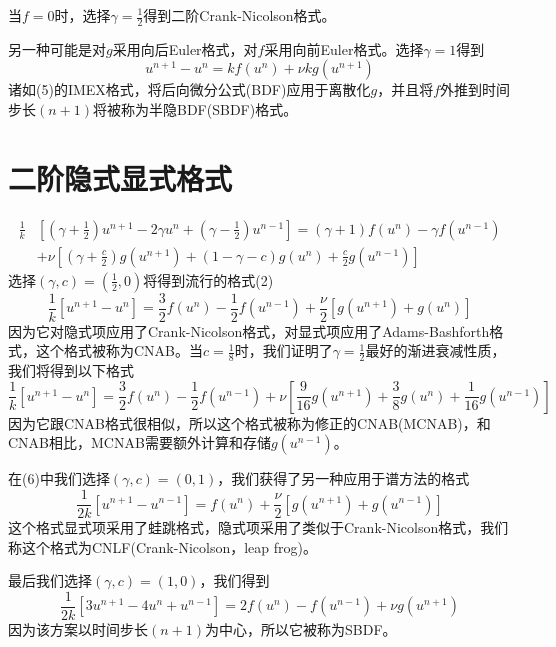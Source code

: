 \documentclass[12pt,a4paper]{article}
\begin{document}
当$f=0$时，选择$\gamma=\frac{1}{2}$得到二阶Crank-Nicolson格式。

另一种可能是对$g$采用向后Euler格式，对$f$采用向前Euler格式。选择$\gamma=1$得到
\begin{equation}
u^{n+1}-u^n=kf(u^n)+\nu kg(u^{n+1})
\end{equation}
诸如(5)的IMEX格式，将后向微分公式(BDF)应用于离散化$g$，并且将$f$外推到时间步长$(n+1)$将被称为半隐BDF(SBDF)格式。
\section{二阶隐式显式格式}
\begin{equation}
\begin{aligned}
\frac{1}{k}&\left[\left(\gamma+\frac{1}{2}\right)u^{n+1}-2\gamma u^n+\left(\gamma-\frac{1}{2}\right)u^{n-1}\right]=(\gamma+1)f(u^n)-\gamma f(u^{n-1})\\
&+\nu\left[\left(\gamma+\frac{c}{2}\right)g(u^{n+1})+(1-\gamma-c)g(u^n)+\frac{c}{2}g(u^{n-1})\right]
\end{aligned}
\end{equation}
选择$(\gamma,c)=(\frac{1}{2},0)$将得到流行的格式(2)
\begin{equation}
\frac{1}{k}[u^{n+1}-u^n]=\frac{3}{2}f(u^n)-\frac{1}{2}f(u^{n-1})+\frac{\nu}{2}[g(u^{n+1})+g(u^n)]
\end{equation}
因为它对隐式项应用了Crank-Nicolson格式，对显式项应用了Adams-Bashforth格式，这个格式被称为CNAB。当$c=\frac{1}{8}$时，我们证明了$\gamma=\frac{1}{2}$最好的渐进衰减性质，我们将得到以下格式
\begin{equation}
\frac{1}{k}[u^{n+1}-u^n]=\frac{3}{2}f(u^n)-\frac{1}{2}f(u^{n-1})+\nu\left[\frac{9}{16}g(u^{n+1})+\frac{3}{8}g(u^n)+\frac{1}{16}g(u^{n-1})\right]
\end{equation}
因为它跟CNAB格式很相似，所以这个格式被称为修正的CNAB(MCNAB)，和CNAB相比，MCNAB需要额外计算和存储$g(u^{n-1})$。

在(6)中我们选择$(\gamma,c)=(0,1)$，我们获得了另一种应用于谱方法的格式
\begin{equation}
\frac{1}{2k}[u^{n+1}-u^{n-1}]=f(u^n)+\frac{\nu}{2}[g(u^{n+1})+g(u^{n-1})]
\end{equation}
这个格式显式项采用了蛙跳格式，隐式项采用了类似于Crank-Nicolson格式，我们称这个格式为CNLF(Crank-Nicolson，leap frog)。

最后我们选择$(\gamma,c)=(1,0)$，我们得到
\begin{equation}
\frac{1}{2k}[3u^{n+1}-4u^n+u^{n-1}]=2f(u^n)-f(u^{n-1})+\nu g(u^{n+1})
\end{equation}
因为该方案以时间步长$(n+1)$为中心，所以它被称为SBDF。
\end{document}
